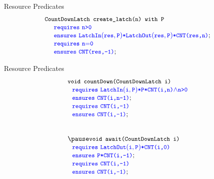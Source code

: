 \begin{frame}{Resource Predicates}
\[
\begin{array}{l}
\code{\CDL~\createlatch(n)~with~P}\\
\SPEC{~~~~\requires~\code{n\sm{\gt}0}} \\
\SPEC{~~~~\ensures~ \LatchIn{res}{P} {\sep}\LatchOut{res}{P}{\sep}\code{CNT(res,n)}}; \\
\SPEC{~~~~\requires~\code{n\sm{=}0}} \\
\SPEC{~~~~\ensures~ \code{CNT(res,-1)}}; \\
\end{array}
\]
\end{frame}

\begin{frame}{Resource Predicates}
\[
\begin{array}{l}
\code{void~countDown(\CDL~i)}\\
~~
\SPEC{\requires~\LatchIn{i}{P}{\sep}\code{P}{\sep}\code{CNT(i,n)}\sm{\wedge}\code{n{>}0}}\\ 
~~ \SPEC{\ensures~ \code{CNT(i,n{-}1)}};\\ 
~~
\SPEC{\requires~\code{CNT(i,-1)}}\\
~~ \SPEC{\ensures~ \code{CNT(i,-1)}};\\
\\
\\
\pause
\code{void~await(\CDL~i)}\\
~~ \SPEC{\requires~\LatchOut{i}{P}{\sep}\code{CNT(i,0)}}\\
~~ \SPEC{\ensures~ \code{P}{\sep}\code{CNT(i,-1)}};\\
~~ \SPEC{\requires~\code{CNT(i,-1)}}\\
~~ \SPEC{\ensures~ \code{CNT(i,-1)}};%
\end{array}
\]
\end{frame}

